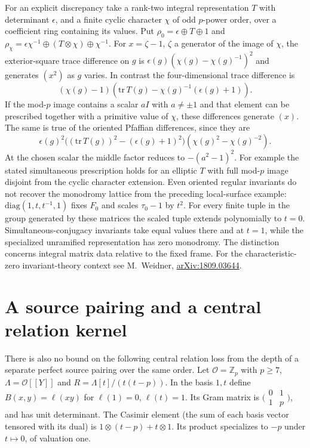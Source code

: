 \documentclass[11pt]{article}
\newcommand{\OO}{\mathcal O}
\begin{document}
For an explicit discrepancy take a rank-two integral representation
$T$ with determinant $\epsilon$, and a finite cyclic character $\chi$
of odd $p$-power order, over a coefficient ring containing its values.
Put $\rho_0=\epsilon\oplus T\oplus1$ and
$\rho_\chi=\epsilon\chi^{-1}\oplus(T\otimes\chi)\oplus\chi^{-1}$.
For $x=\zeta-1$, $\zeta$ a generator of the image of $\chi$, the
exterior-square trace difference on $g$ is
$\epsilon(g)(\chi(g)-\chi(g)^{-1})^2$ and generates $(x^2)$ as $g$
varies. In contrast the four-dimensional trace difference is
\[
 (\chi(g)-1)(\mathrm{tr}\,T(g)-\chi(g)^{-1}(\epsilon(g)+1)).
\]
If the mod-$p$ image contains a scalar $aI$ with $a\ne\pm1$ and that
element can be prescribed together with a primitive value of $\chi$,
these differences generate $(x)$. The same is true of the oriented
Pfaffian differences, since they are
\[
 \epsilon(g)^2
 \big((\mathrm{tr}\,T(g))^2-(\epsilon(g)+1)^2\big)
 (\chi(g)^2-\chi(g)^{-2}).
\]
At the chosen scalar the middle factor reduces to $-(a^2-1)^2$.
For example the stated simultaneous prescription holds for an
elliptic $T$ with full mod-$p$ image disjoint from the cyclic
character extension. Even oriented regular invariants do not recover
the monodromy lattice from the preceding local-surface example:
$\mathrm{diag}(1,t,t^{-1},1)$ fixes $F_0$ and scales
$\tau_0-1$ by $t^2$. For every finite tuple in the group generated by
these matrices the scaled tuple extends polynomially to $t=0$.
Simultaneous-conjugacy invariants take equal values there and at
$t=1$, while the specialized unramified representation has zero
monodromy. The distinction concerns integral matrix data relative to
the fixed frame. For the characteristic-zero invariant-theory context
see M.~Weidner, \href{https://arxiv.org/abs/1809.03644}{arXiv:1809.03644}.

\section{A source pairing and a central relation kernel}
There is also no bound on the following central relation loss from
the depth of a separate perfect source pairing over the same order.
Let $\OO=\mathbb Z_p$ with $p\ge7$, $\Lambda=\OO[[Y]]$ and
$R=\Lambda[t]/(t(t-p))$. In the basis $1,t$ define
$B(x,y)=\ell(xy)$ for $\ell(1)=0$, $\ell(t)=1$. Its Gram matrix is
$\bigl(\begin{smallmatrix}0&1\\1&p\end{smallmatrix}\bigr)$, and has unit determinant.
The Casimir element (the sum of each basis vector tensored with its
dual) is $1\otimes(t-p)+t\otimes1$. Its product specializes to
$-p$ under $t\mapsto0$, of valuation one.
\end{document}
